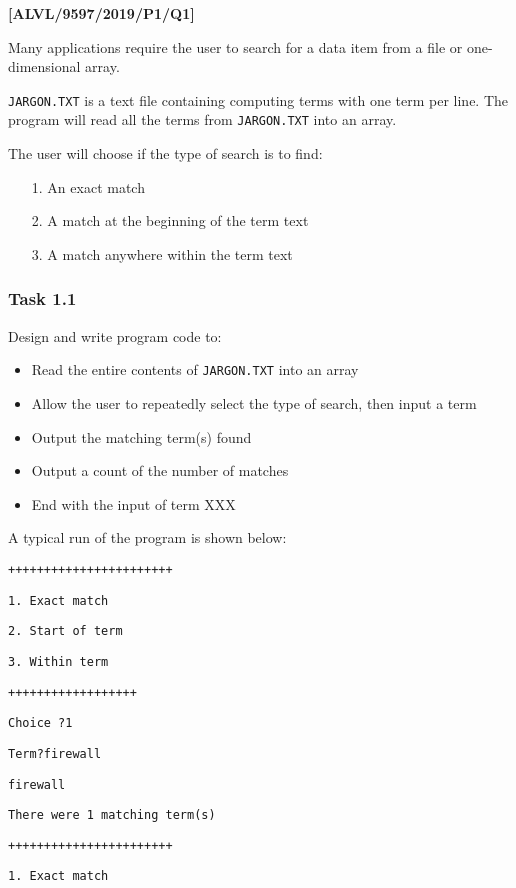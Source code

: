 \item \textbf{{[}ALVL/9597/2019/P1/Q1{]} }

Many applications require the user to search for a data item from
a file or one-dimensional array.

\texttt{JARGON.TXT} is a text file containing computing terms with
one term per line. The program will read all the terms from \texttt{JARGON.TXT}
into an array.

The user will choose if the type of search is to find:
\begin{enumerate}
\item[1.]  An exact match 
\item[2.]  A match at the beginning of the term text
\item[3.]  A match anywhere within the term text
\end{enumerate}

\subsubsection*{Task 1.1}

Design and write program code to:
\begin{itemize}
\item Read the entire contents of \texttt{JARGON.TXT} into an array 
\item Allow the user to repeatedly select the type of search, then input
a term 
\item Output the matching term(s) found 
\item Output a count of the number of matches 
\item End with the input of term \textquotedbl XXX\textquotedbl{}
\end{itemize}
A typical run of the program is shown below:

\texttt{+++++++++++++++++++++++ }

\texttt{1. Exact match }

\texttt{2. Start of term }

\texttt{3. Within term }

\texttt{++++++++++++++++++ }

\texttt{Choice ?1 }

\texttt{Term?firewall }

\texttt{firewall }

\texttt{There were 1 matching term(s)}

\texttt{+++++++++++++++++++++++ }

\texttt{1. Exact match }

